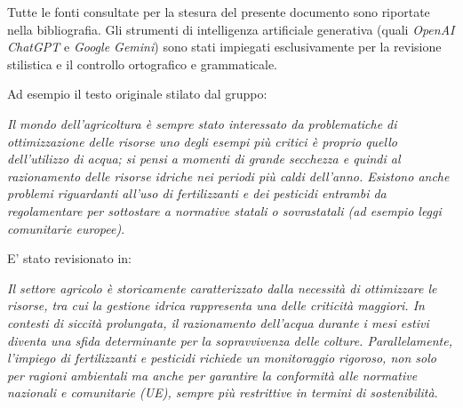 Tutte le fonti consultate per la stesura del presente documento sono riportate nella bibliografia. Gli strumenti di intelligenza artificiale generativa (quali \textit{OpenAI ChatGPT} e \textit{Google Gemini}) sono stati impiegati esclusivamente per la revisione stilistica e il controllo ortografico e grammaticale.\newline

\noindent Ad esempio il testo originale stilato dal gruppo:\newline

\noindent \textit{Il mondo dell'agricoltura è sempre stato interessato da problematiche di ottimizzazione delle risorse uno degli esempi più critici è proprio quello dell'utilizzo di acqua; si pensi a momenti di grande secchezza e quindi al razionamento delle risorse idriche nei periodi più caldi dell'anno. Esistono anche problemi riguardanti all'uso di fertilizzanti e dei pesticidi entrambi da regolamentare per sottostare a normative statali o sovrastatali (ad esempio leggi comunitarie europee)}.\newline

\noindent E' stato revisionato in:\newline

\noindent\textit{Il settore agricolo è storicamente caratterizzato dalla necessità di ottimizzare le risorse, tra cui la gestione idrica rappresenta una delle criticità maggiori. In contesti di siccità prolungata, il razionamento dell'acqua durante i mesi estivi diventa una sfida determinante per la sopravvivenza delle colture. Parallelamente, l'impiego di fertilizzanti e pesticidi richiede un monitoraggio rigoroso, non solo per ragioni ambientali ma anche per garantire la conformità alle normative nazionali e comunitarie (UE), sempre più restrittive in termini di sostenibilità}.
